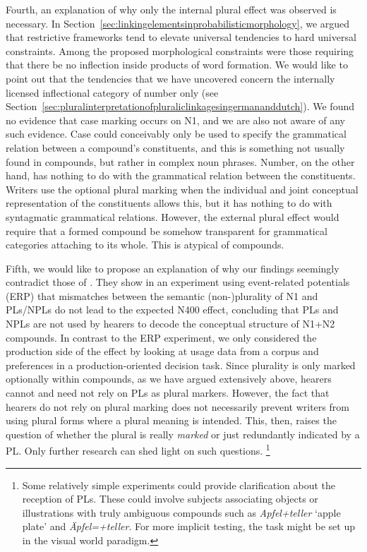 Fourth, an explanation of why only the internal plural effect was observed is necessary.
In Section~\ref{sec:linkingelementsinprobabilisticmorphology}, we argued that restrictive frameworks tend to elevate universal tendencies to hard universal constraints.
Among the proposed morphological constraints were those requiring that there be no inflection inside products of word formation.
We would like to point out that the tendencies that we have uncovered concern the internally licensed inflectional category of number only (see Section~\ref{sec:pluralinterpretationofpluraliclinkagesingermananddutch}).
We found no evidence that case marking occurs on N1, and we are also not aware of any such evidence.
Case could conceivably only be used to specify the grammatical relation between a compound's constituents, and this is something not usually found in compounds, but rather in complex noun phrases.
Number, on the other hand, has nothing to do with the grammatical relation between the constituents.
Writers use the optional plural marking when the individual and joint conceptual representation of the constituents allows this, but it has nothing to do with syntagmatic grammatical relations.
However, the external plural effect would require that a formed compound be somehow transparent for grammatical categories attaching to its whole.
This is atypical of compounds.

Fifth, we would like to propose an explanation of why our findings seemingly contradict those of \textcite{KoesterEa2004}.
They show in an experiment using event-related potentials (ERP) that mismatches between the semantic (non-)plurality of N1 and PLs\slash NPLs do not lead to the expected N400 effect, concluding that PLs and NPLs are not used by hearers to decode the conceptual structure of N1+N2 compounds.
In contrast to the ERP experiment, we only considered the production side of the effect by looking at usage data from a corpus and preferences in a production-oriented decision task.
Since plurality is only marked optionally within compounds, as we have argued extensively above, hearers cannot and need not rely on PLs as plural markers.
However, the fact that hearers do not rely on plural marking does not necessarily prevent writers from using plural forms where a plural meaning is intended.
This, then, raises the question of whether the plural is really \textit{marked} or just redundantly indicated by a PL.
Only further research can shed light on such questions.%
\footnote{Some relatively simple experiments could provide clarification about the reception of PLs.
These could involve subjects associating objects or illustrations with truly ambiguous compounds such as \textit{Apfel+teller} `apple plate' and \textit{Äpfel=+teller}.
For more implicit testing, the task might be set up in the visual world paradigm.}

